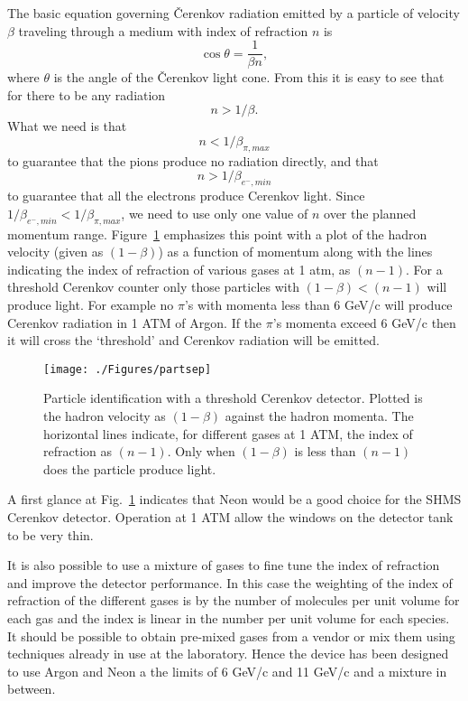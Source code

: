 \documentclass[11pt]{article}
\begin{document}
The basic equation  governing \v Cerenkov radiation emitted by a particle 
of velocity $\beta$ traveling through a medium with index of refraction
$n$ is \begin{equation}\cos \theta = \frac{1}{\beta n},\end{equation}
where $\theta$ is the angle of the \v Cerenkov light cone.
From this it is easy to see that for there to be any radiation
$$n > 1/\beta.$$
What we need is that 
\begin{equation} n < 1/\beta_{\pi,max}\label{eq:index} \end{equation}
to guarantee that the pions produce no radiation directly, and that
\begin{equation} n > 1/\beta_{e^-,min} \end{equation}
to guarantee that all the electrons produce  Cerenkov light. Since
$1/\beta_{e^-,min} < 1/\beta_{\pi,max}$, we need to use only one value of $n$
over the planned momentum range. Figure~\ref{fig:partsep}  emphasizes this point with a plot of the hadron velocity (given as $(1-\beta)$) as a function of momentum along with the lines indicating the index of refraction  of various gases at 1 atm, as $(n-1)$.  For a threshold Cerenkov counter only those particles with $(1-\beta) < (n-1)$ will produce light. For example no $\pi$'s with momenta less than 6 GeV/c will produce Cerenkov radiation in 1 ATM of Argon. If the $\pi$'s momenta exceed 6 GeV/c then it will cross the `threshold' and Cerenkov radiation will be emitted.
 \begin{figure}[!h] %
   \centering
   \texttt{[image: ./Figures/partsep]} 
   \caption{Particle identification with a threshold Cerenkov detector. Plotted is the hadron velocity as $(1-\beta)$ against the hadron momenta. The horizontal lines indicate, for different gases at 1 ATM, the index of refraction as $(n-1)$. Only when $(1-\beta)$ is less than $(n-1)$ does the particle produce light.}
   \label{fig:partsep}
\end{figure}
A first glance at Fig.~\ref{fig:partsep} indicates that Neon would be a good choice for the SHMS Cerenkov detector. Operation at 1 ATM  allow the windows on the detector tank to be very thin.

It is also possible to use a mixture of gases to fine tune the index of refraction and improve the detector performance. In this case the weighting of the index of refraction of the different gases is by the number of molecules per unit volume for each gas and the index is linear in  the number per unit volume for each species. It should be possible to obtain pre-mixed gases from a vendor or mix them using techniques already in use at the laboratory. Hence the device has been designed to use Argon and Neon a the limits of 6 GeV/c and 11 GeV/c and a mixture in between.
\end{document}
